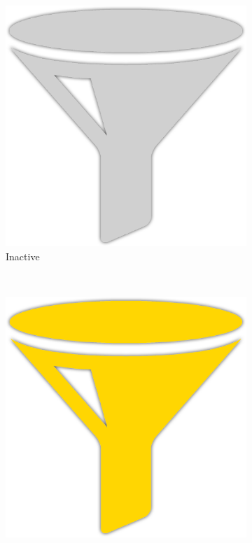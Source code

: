 \begin{figure}[H]
    \centering
    \begin{subfigure}[t]{0.25\textwidth}
        \centering
	\label{fig:chromeInactive}
        \includegraphics[scale=\figureScale]{Figures/greyPlain}
        \caption{Inactive}
    \end{subfigure}%
    ~ 
    \begin{subfigure}[t]{0.25\textwidth}
        \centering
\label{fig:chromeParsing}
        \includegraphics[scale=\figureScale]{Figures/yellowPlain}

\end{subfigure}
\end{figure}
